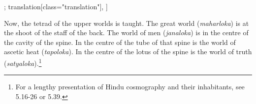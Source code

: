 \begin{alignment}[
  texts=edition[class="edition"];
  translation[class="translation"],
  ]
\begin{translation}
\begin{tlate}[p33_01]
\end{tlate}
\begin{tlate}[p34_01]
Now, the tetrad of the upper worlds is taught. The great world (\textit{maharloka}) is at the shoot of the staff of the back. The world of men (\textit{janaloka}) is in the centre of the cavity of the spine. In the centre of the tube of that spine is the world of ascetic heat (\textit{tapoloka}). In the centre of the lotus of the spine is the world of truth (\textit{satyaloka}).\footnote{For a lengthy presentation of Hindu cosmography and their inhabitants, see  5.16-26 or  5.39.}
\flushpage 
\end{tlate}
  \end{translation}
\end{alignment}
\pagebreak %
